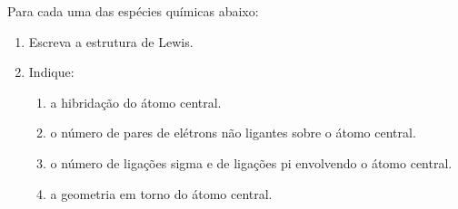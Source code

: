 Para cada uma das espécies químicas abaixo:

\begin{enumerate*}[label = (\roman*)]
	\item {}
	\item {}
	\item {}
	\item {}
	\item {} 
\end{enumerate*}

\begin{enumerate}[label = (\alph*)]
	\item Escreva a estrutura de Lewis.
	\item Indique:
		\begin{enumerate}[label = (b.\roman*)]
			\item a hibridação do átomo central.
			\item o número de pares de elétrons não ligantes sobre o átomo central.
			\item o número de ligações sigma e de ligações pi envolvendo o átomo central.
			\item a geometria em torno do átomo central.
		\end{enumerate}	
\end{enumerate}


